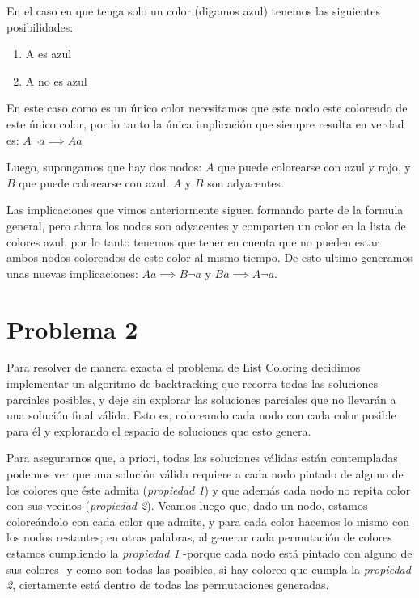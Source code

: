 \documentclass{article}
\theoremstyle{definition}
\theoremstyle{remark}
\begin{document}
En el caso en que tenga solo un color (digamos azul) tenemos las siguientes posibilidades:
\begin{enumerate}
\item A es azul
\item A no es azul
\end{enumerate}
En este caso como es un único color necesitamos que este nodo este coloreado de este único color, por lo tanto la única implicación que siempre resulta en verdad es: $A\neg a \implies Aa$

Luego, supongamos que hay dos nodos: $A$ que puede colorearse con azul y rojo, y $B$ que puede colorearse con azul. $A$ y $B$ son adyacentes.

Las implicaciones que vimos anteriormente siguen formando parte de la formula general, pero ahora los nodos son adyacentes y comparten un color en la lista de colores azul, por lo tanto tenemos que tener en cuenta que no pueden estar ambos nodos coloreados de este color al mismo tiempo. De esto ultimo generamos unas nuevas implicaciones: $Aa \implies B\neg a$ y $Ba \implies A\neg a$.

\section{Problema 2}

Para resolver de manera exacta el problema de List Coloring decidimos implementar un algoritmo de backtracking que recorra todas las soluciones parciales posibles, y deje sin explorar las soluciones parciales que no llevarán a una solución final válida. Esto es, coloreando cada nodo con cada color posible para él y explorando el espacio de soluciones que esto genera. 

Para asegurarnos que, a priori, todas las soluciones válidas están contempladas podemos ver que una solución válida requiere a cada nodo pintado de alguno de los colores que éste admita (\textit{propiedad 1}) y que además cada nodo no repita color con sus vecinos (\textit{propiedad 2}). Veamos luego que, dado un nodo, estamos coloreándolo con cada color que admite, y para cada color hacemos lo mismo con los nodos restantes; en otras palabras, al generar cada permutación de colores estamos cumpliendo la \textit{propiedad 1} -porque cada nodo está pintado con alguno de sus colores- y como son todas las posibles, si hay coloreo que cumpla la \textit{propiedad 2}, ciertamente está dentro de todas las permutaciones generadas. 
\end{document}
